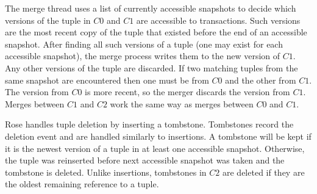 \documentclass{vldb}
\newcommand{\rows}{Rose\xspace}
\begin{document}
The merge thread uses a list of currently accessible snapshots
to decide which versions of the tuple in $C0$ and $C1$ are accessible
to transactions.  Such versions are the most recent copy of the tuple that
existed before the end of an accessible snapshot.  After finding all
such versions of a tuple (one may exist for each accessible snapshot),
the merge process writes them to the new version of $C1$.  Any other
versions of the tuple are discarded.  If two matching tuples from the
same snapshot are encountered then one must be from $C0$ and the other
from $C1$.  The version from $C0$ is more recent, so the merger
discards the version from $C1$.  Merges between $C1$ and $C2$ work the
same way as merges between $C0$ and $C1$.

\rows handles tuple deletion by inserting a tombstone.  Tombstones
record the deletion event and are handled similarly to insertions.  A
tombstone will be kept if it is the newest version of a tuple in at
least one accessible snapshot.  Otherwise, the tuple was reinserted
before next accessible snapshot was taken and the tombstone is
deleted.  Unlike insertions, tombstones in $C2$ are deleted if they
are the oldest remaining reference to a tuple.



\end{document}
